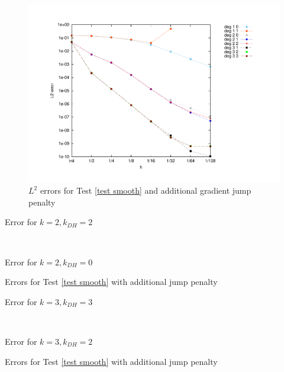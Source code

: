 \begin{figure}[h!]
\centering
	\includegraphics[scale=0.45]{plots/MA1_Neilan_GradJump_l2.pdf}
	\caption{$L^2$ errors for Test \ref{test smooth} and additional gradient jump penalty}
	\label{fig: l2 errors test 1 jump}
\end{figure}
\begin{table}[H]
	\begin{subtable}[b]{0.4\textwidth}
		\centering
		\pgfplotstabletypeset[
		columns={iterations, l2error, h1error,N},
		every row 0 column 0/.style={set content=init},
		]\MAOneJumpdegTwoTwo
		\caption{Error for $k=2, k_{DH}=2$}
	\end{subtable}
	~
	\begin{subtable}[b]{0.4\textwidth}
		\centering
		\pgfplotstabletypeset[columns={iterations, l2error, h1error,N},
		every row 0 column 0/.style={set content=init},
		]\MAOneJumpdegTwoZero
		\caption{Error for $k=2, k_{DH}=0$}
	\end{subtable}
	\caption{Errors for Test \ref{test smooth} with additional jump penalty}
	\label{tab: l2 errors test 1 deg 2 jump}
\end{table}
\begin{table}[h]
	\begin{subtable}[b]{0.45\textwidth}
		\centering
		\pgfplotstabletypeset[
		columns={iterations, l2error, h1error,N},
		every row 0 column 0/.style={set content=init},
		]\MAOneJumpdegThreeThree
		\caption{Error for $k=3, k_{DH}=3$}
	\end{subtable}
	~
	\begin{subtable}[b]{0.45\textwidth}
		\centering
		\pgfplotstabletypeset[columns={iterations, l2error, h1error,N},
		every row 0 column 0/.style={set content=init},
		]\MAOneJumpdegThreeTwo
		\caption{Error for $k=3, k_{DH}=2$}
	\end{subtable}
	\caption{Errors for Test \ref{test smooth} with additional jump penalty}
	\label{tab: l2 errors test 1 deg 3 jump}
\end{table}

